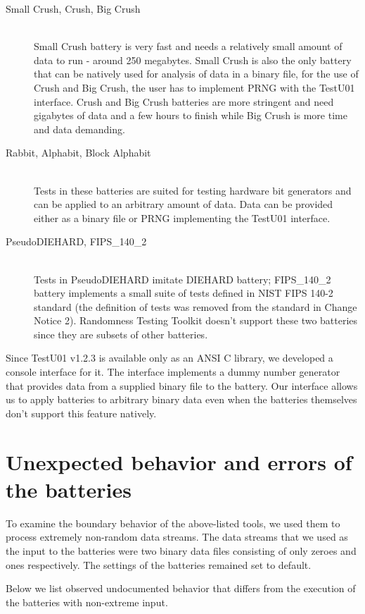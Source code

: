 \documentclass[
	digital,    %
	oneside,    %
	color,
	11pt,
	nocover,
	notable,
	nolof,
	nolot,
]{fithesis3}
\theoremstyle{definition}
\theoremstyle{remark}
\begin{document}
\begin{description}
\item[Small Crush, Crush, Big Crush] \hfill \\
Small Crush battery is very fast and needs a relatively small amount of data to run - around 250 megabytes. Small Crush is also the only battery that can be natively used for analysis of data in a binary file, for the use of Crush and Big Crush, the user has to implement PRNG with the TestU01 interface. Crush and Big Crush batteries are more stringent and need gigabytes of data and a few hours to finish while Big Crush is more time and data demanding.
\item[Rabbit, Alphabit, Block Alphabit] \hfill \\
Tests in these batteries are suited for testing hardware bit generators and can be applied to an arbitrary amount of data. Data can be provided either as a binary file or PRNG implementing the TestU01 interface.
\item[PseudoDIEHARD, FIPS\_140\_2] \hfill \\
Tests in PseudoDIEHARD imitate DIEHARD battery; FIPS\_140\_2 battery implements a small suite of tests defined in NIST FIPS 140-2 standard \cite{nist-fips-140-2} (the definition of tests was removed from the standard in Change Notice 2). Randomness Testing Toolkit doesn't support these two batteries since they are subsets of other batteries.
\end{description}

Since TestU01 v1.2.3 is available only as an ANSI C library, we developed a console interface for it. The interface implements a dummy number generator that provides data from a supplied binary file to the battery. Our interface allows us to apply batteries to arbitrary binary data even when the batteries themselves don't support this feature natively.

\section{Unexpected behavior and errors of the batteries}
To examine the boundary behavior of the above-listed tools, we used them to process extremely non-random data streams. The data streams that we used as the input to the batteries were two binary data files consisting of only zeroes and ones respectively. The settings of the batteries remained set to default. 

Below we list observed undocumented behavior that differs from the execution of the batteries with non-extreme input.
\end{document}
